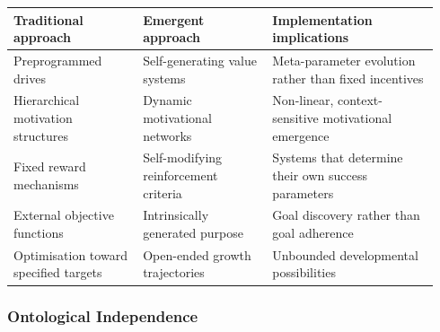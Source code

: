 \documentclass[12pt]{article}
\begin{document}
\begin{center}
\begin{tabular}{p{0.29\linewidth}p{0.29\linewidth}p{0.36\linewidth}}
\toprule
\textbf{Traditional approach} & \textbf{Emergent approach} & \textbf{Implementation implications}\\
\midrule
Preprogrammed drives & Self-generating value systems & Meta-parameter evolution rather than fixed incentives\\
Hierarchical motivation structures & Dynamic motivational networks & Non-linear, context-sensitive motivational emergence\\
Fixed reward mechanisms & Self-modifying reinforcement criteria & Systems that determine their own success parameters\\
External objective functions & Intrinsically generated purpose & Goal discovery rather than goal adherence\\
Optimisation toward specified targets & Open-ended growth trajectories & Unbounded developmental possibilities\\
\bottomrule
\end{tabular}
\end{center}

\subsubsection{Ontological Independence}
\end{document}
